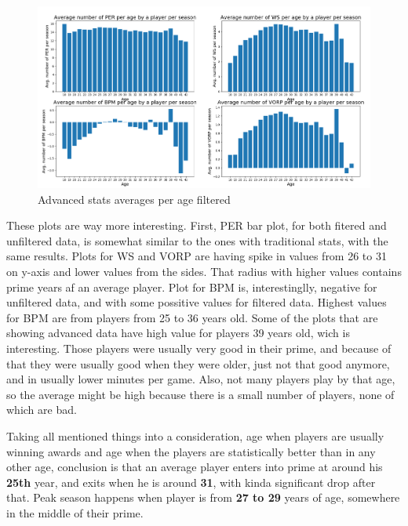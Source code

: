 \documentclass[a4paper]{article}
\begin{document}
\begin{figure}[h!]
\begin{center}
\includegraphics[scale=0.3]{advanced_stats_per_age_filtered.png}
\end{center}
\caption{Advanced stats averages per age filtered}
\label{plt:advanced_age_filtered}
\end{figure}

These plots are way more interesting. First, PER bar plot, for both fitered and unfiltered data, is somewhat similar to the ones with traditional stats, with the same results. Plots for WS and VORP are having spike in values from 26 to 31 on y-axis and lower values from the sides. That radius with higher values contains prime years af an average player. Plot for BPM is, interestinglly, negative for unfiltered data, and with some possitive values for filtered data. Highest values for BPM are from players from 25 to 36 years old. Some of the plots that are showing advanced data have high value for players 39 years old, wich is interesting. Those players were usually very good in their prime, and because of that they were usually good when they were older, just not that good anymore, and in usually lower minutes per game. Also, not many players play by that age, so the average might be high because there is a small number of players, none of which are bad.

Taking all mentioned things into a consideration, age when players are usually winning awards and age when the players are statistically better than in any other age, conclusion is that an average player enters into prime at around his \textbf{25th} year, and exits when he is around \textbf{31}, with kinda significant drop after that. Peak season happens when player is from \textbf{27 to 29} years of age, somewhere in the middle of their prime.
\end{document}
